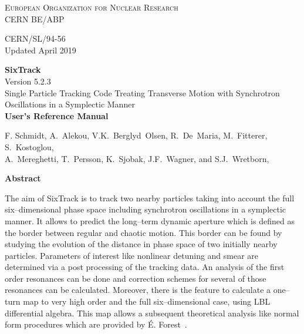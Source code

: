 \begin{titlepage}
\begin{center}\normalsize\scshape
    European Organization for Nuclear Research \\
    CERN BE/ABP
\end{center}
\vspace*{2mm}
\begin{flushright}
    CERN/SL/94-56 \\
    Updated April 2019
\end{flushright}
\begin{center}\Huge
    \textbf{SixTrack} \\
    \LARGE Version 5.2.3 \\
    \vspace*{8mm}Single Particle Tracking Code Treating Transverse Motion with Synchrotron Oscillations in a Symplectic Manner \\
    \vspace*{8mm}\textbf{User's Reference Manual}
\end{center}
\begin{center}
    F. Schmidt,
    A.~Alekou,
    V.K.~Berglyd~Olsen,
    R.~De~Maria,
    M.~Fitterer,
    S.~Kostoglou,\\
    A.~Mereghetti,
    T.~Persson,
    K.~Sjobak,
    J.F.~Wagner,
    and
    S.J.~Wretborn,
\end{center}
\begin{center}\large
    \vspace*{10mm}\textbf{Abstract} \\
\end{center}
The aim of SixTrack is to track two nearby particles taking into account the full six--dimensional phase space including synchrotron oscillations in a symplectic manner.
It allows to predict the long--term dynamic aperture which is defined as the border between regular and chaotic motion.
This border can be found by studying the evolution of the distance in phase space of two initially nearby particles.
Parameters of interest like nonlinear detuning and smear are determined via a post processing of the tracking data.
An analysis of the first order resonances can be done and correction schemes for several of those resonances can be calculated.
Moreover, there is the feature to calculate a one--turn map to very high order and the full six--dimensional case, using LBL differential algebra.
This map allows a subsequent theoretical analysis like normal form procedures which are provided by \'{E}. Forest~\cite{DALIE}.


\end{titlepage}
